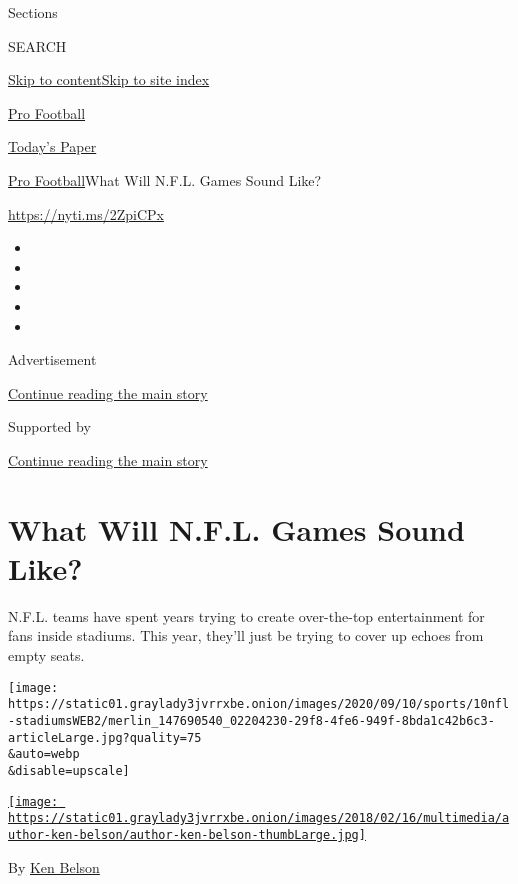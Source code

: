 Sections

SEARCH

\protect\hyperlink{site-content}{Skip to
content}\protect\hyperlink{site-index}{Skip to site index}

\href{https://www.nytimes3xbfgragh.onion/section/sports/football}{Pro
Football}

\href{https://myaccount.nytimes3xbfgragh.onion/auth/login?response_type=cookie\&client_id=vi}{}

\href{https://www.nytimes3xbfgragh.onion/section/todayspaper}{Today's
Paper}

\href{/section/sports/football}{Pro Football}\textbar{}What Will N.F.L.
Games Sound Like?

\url{https://nyti.ms/2ZpiCPx}

\begin{itemize}
\item
\item
\item
\item
\item
\end{itemize}

Advertisement

\protect\hyperlink{after-top}{Continue reading the main story}

Supported by

\protect\hyperlink{after-sponsor}{Continue reading the main story}

\hypertarget{what-will-nfl-games-sound-like}{%
\section{What Will N.F.L. Games Sound
Like?}\label{what-will-nfl-games-sound-like}}

N.F.L. teams have spent years trying to create over-the-top
entertainment for fans inside stadiums. This year, they'll just be
trying to cover up echoes from empty seats.

\texttt{[image: https://static01.graylady3jvrrxbe.onion/images/2020/09/10/sports/10nfl-stadiumsWEB2/merlin\_147690540\_02204230-29f8-4fe6-949f-8bda1c42b6c3-articleLarge.jpg?quality=75\\\&auto=webp\\\&disable=upscale]}

\href{https://www.nytimes3xbfgragh.onion/by/ken-belson}{\texttt{[image: https://static01.graylady3jvrrxbe.onion/images/2018/02/16/multimedia/author-ken-belson/author-ken-belson-thumbLarge.jpg]}}

By \href{https://www.nytimes3xbfgragh.onion/by/ken-belson}{Ken Belson}

